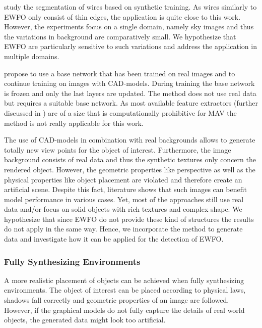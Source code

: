 \citeauthor{Madaan2017}\cite{Madaan2017} study the segmentation of wires based on synthetic training. As wires similarly to \ac{EWFO} only consist of thin edges, the application is quite close to this work. However, the experiments focus on a single domain, namely sky images and thus the variations in background are comparatively small. We hypothesize that \ac{EWFO} are particularly sensitive to such variations and address the application in multiple domains.

\citeauthor{Hinterstoisser2017} \cite{Hinterstoisser2017} propose to use a base network that has been trained on real images and to continue training on images with \ac{CAD}-models. During training the base network is frozen and only the last layers are updated. The method does not use real data but requires a suitable base network. As most available feature extractors (further discussed in ) are of a size that is computationally prohibitive for \ac{MAV} the method is not really applicable for this work. 

The use of CAD-models in combination with real backgrounds allows to generate totally new view points for the object of interest. Furthermore, the image background consists of real data and thus the synthetic textures only concern the rendered object. However, the geometric properties like perspective as well as the physical properties like object placement are violated and therefore create an artificial scene. Despite this fact, literature shows that such images can benefit model performance in various cases. Yet, most of the approaches still use real data and/or focus on solid objects with rich textures and complex shape. We hypothesize that since \ac{EWFO} do not provide these kind of structures the results do not apply in the same way. Hence, we incorporate the method to generate data and investigate how it can be applied for the detection of \ac{EWFO}.

\subsubsection{Fully Synthesizing Environments}

A more realistic placement of objects can be achieved when fully synthesizing environments.  The object of interest can be placed according to physical laws, shadows fall correctly and geometric properties of an image are followed. However, if the graphical models do not fully capture the details of real world objects, the generated data might look too artificial.

